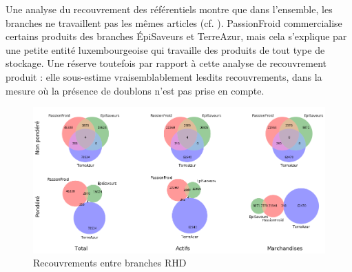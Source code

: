                 \begin{figure}[htbp]\CenterFloatBoxes
                    \begin{floatrow}
                    \end{floatrow}
                \end{figure}
                    
                Une analyse du recouvrement des référentiels montre que dans l'ensemble, les branches ne travaillent pas les mêmes articles (cf. ).
                PassionFroid commercialise certains produits des branches \'{E}piSaveurs et TerreAzur, mais cela s'explique par une petite entité luxembourgeoise qui travaille des produits de tout type de stockage.
                Une réserve toutefois par rapport à cette analyse de recouvrement produit : elle sous-estime vraisemblablement lesdits recouvrements, dans la mesure où la présence de doublons n'est pas prise en compte.

                \begin{figure}[htbp]
                    \begin{center}
                    \includegraphics[width=\linewidth]{img/Diagrammes de Venn articles.png}
                    \end{center}
                    \caption{Recouvrements entre branches RHD}
                    \label{fig:venn_article}
                \end{figure}       

